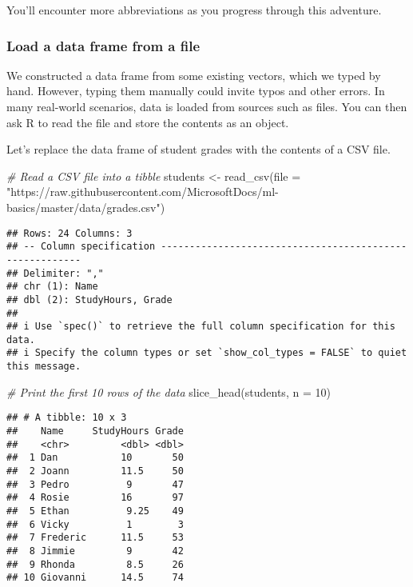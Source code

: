 \documentclass[
]{article}
\newenvironment{Shaded}{\begin{snugshade}}{\end{snugshade}}
\newcommand{\AttributeTok}[1]{\textcolor[rgb]{0.77,0.63,0.00}{#1}}
\newcommand{\CommentTok}[1]{\textcolor[rgb]{0.56,0.35,0.01}{\textit{#1}}}
\newcommand{\DecValTok}[1]{\textcolor[rgb]{0.00,0.00,0.81}{#1}}
\newcommand{\FunctionTok}[1]{\textcolor[rgb]{0.00,0.00,0.00}{#1}}
\newcommand{\NormalTok}[1]{#1}
\newcommand{\OtherTok}[1]{\textcolor[rgb]{0.56,0.35,0.01}{#1}}
\newcommand{\StringTok}[1]{\textcolor[rgb]{0.31,0.60,0.02}{#1}}
\begin{document}
You'll encounter more abbreviations as you progress through this
adventure.

\hypertarget{load-a-data-frame-from-a-file}{%
\subsubsection{Load a data frame from a
file}\label{load-a-data-frame-from-a-file}}

We constructed a data frame from some existing vectors, which we typed
by hand. However, typing them manually could invite typos and other
errors. In many real-world scenarios, data is loaded from sources such
as files. You can then ask R to read the file and store the contents as
an object.

Let's replace the data frame of student grades with the contents of a
CSV file.

\begin{Shaded}
\begin{Highlighting}[]
\CommentTok{\# Read a CSV file into a tibble}
\NormalTok{students }\OtherTok{\textless{}{-}} \FunctionTok{read\_csv}\NormalTok{(}\AttributeTok{file =} \StringTok{"https://raw.githubusercontent.com/MicrosoftDocs/ml{-}basics/master/data/grades.csv"}\NormalTok{)}
\end{Highlighting}
\end{Shaded}

\begin{verbatim}
## Rows: 24 Columns: 3
## -- Column specification --------------------------------------------------------
## Delimiter: ","
## chr (1): Name
## dbl (2): StudyHours, Grade
## 
## i Use `spec()` to retrieve the full column specification for this data.
## i Specify the column types or set `show_col_types = FALSE` to quiet this message.
\end{verbatim}

\begin{Shaded}
\begin{Highlighting}[]
\CommentTok{\# Print the first 10 rows of the data}
\FunctionTok{slice\_head}\NormalTok{(students, }\AttributeTok{n =} \DecValTok{10}\NormalTok{)}
\end{Highlighting}
\end{Shaded}

\begin{verbatim}
## # A tibble: 10 x 3
##    Name     StudyHours Grade
##    <chr>         <dbl> <dbl>
##  1 Dan           10       50
##  2 Joann         11.5     50
##  3 Pedro          9       47
##  4 Rosie         16       97
##  5 Ethan          9.25    49
##  6 Vicky          1        3
##  7 Frederic      11.5     53
##  8 Jimmie         9       42
##  9 Rhonda         8.5     26
## 10 Giovanni      14.5     74
\end{verbatim}
\end{document}
